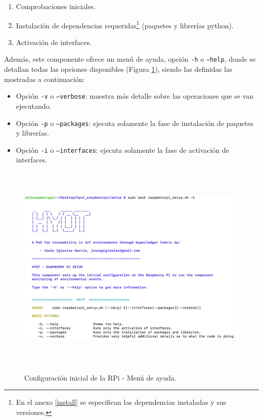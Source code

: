 \documentclass[12pt,a4paper, twoside]{report}
\begin{document}
	\begin{enumerate}
		\item Comprobaciones iniciales.
		\item Instalación de dependencias requeridas\footnote{En el anexo \ref{install} se especifican las dependencias instaladas y sus versiones.} (paquetes y librerías \gls{python}).
		\item Activación de interfaces.
	\end{enumerate}
	
	Además, este componente ofrece un menú de ayuda, opción \texttt{-h} o \texttt{--help}, donde se detallan todas las opciones disponibles (Figura \ref{fig:userguide_setup_help}), siendo las definidas las mostradas a continuación:
	
	\begin{itemize}
		\item Opción \texttt{-v} o \texttt{--verbose}: muestra más detalle sobre las operaciones que se van ejecutando.
		\item Opción \texttt{-p} o \texttt{--packages}: ejecuta solamente la fase de instalación de paquetes y librerías.
		\item Opción \texttt{-i} o \texttt{--interfaces}: ejecuta solamente la fase de activación de interfaces.
	\end{itemize}

	\begin{figure}[!ht]   
		\caption{Configuración inicial de la RPi - Menú de ayuda.} 
		\begin{center} 
			\includegraphics[width=15cm,height=10cm]{Images/userGuide/setup/help} \\
			\label{fig:userguide_setup_help} 
		\end{center}  
	\end{figure}
\end{document}
